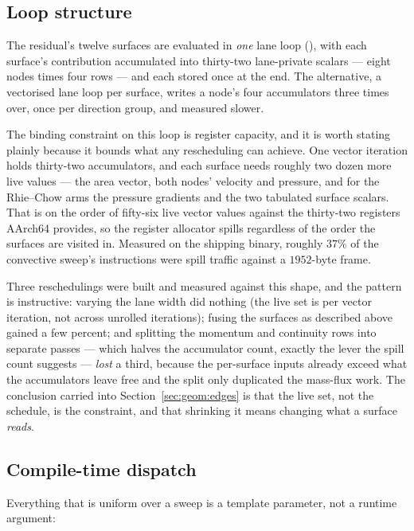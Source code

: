 \subsection{Loop structure}
\label{sec:mk:structure}

The residual's twelve surfaces are evaluated in \emph{one} lane loop
(), with each surface's contribution accumulated into
thirty-two lane-private scalars --- eight nodes times four rows --- and each stored once at the
end. The alternative, a vectorised lane loop per surface, writes a node's four accumulators three
times over, once per direction group, and measured slower.

The binding constraint on this loop is register capacity, and it is worth stating plainly because
it bounds what any rescheduling can achieve. One vector iteration holds thirty-two accumulators,
and each surface needs roughly two dozen more live values --- the area vector, both nodes'
velocity and pressure, and for the Rhie--Chow arms the pressure gradients and the two tabulated
surface scalars. That is on the order of fifty-six live vector values against the thirty-two
registers AArch64 provides, so the register allocator spills regardless of the order the surfaces
are visited in. Measured on the shipping binary, roughly $37\%$ of the convective sweep's
instructions were spill traffic against a $1952$-byte frame.

Three reschedulings were built and measured against this shape, and the pattern is instructive:
varying the lane width did nothing (the live set is per vector iteration, not across unrolled
iterations); fusing the surfaces as described above gained a few percent; and splitting the
momentum and continuity rows into separate passes --- which halves the accumulator count, exactly
the lever the spill count suggests --- \emph{lost} a third, because the per-surface inputs already
exceed what the accumulators leave free and the split only duplicated the mass-flux work. The
conclusion carried into Section~\ref{sec:geom:edges} is that the live set, not the schedule, is the
constraint, and that shrinking it means changing what a surface \emph{reads}.

\subsection{Compile-time dispatch}

Everything that is uniform over a sweep is a template parameter, not a runtime argument:

